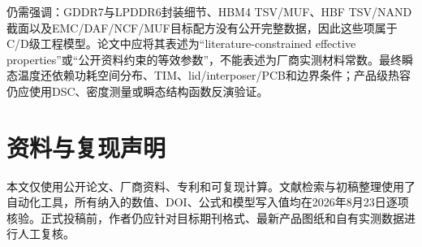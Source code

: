 \documentclass[UTF8,zihao=-4]{ctexart}
\begin{document}
仍需强调：GDDR7与LPDDR6封装细节、HBM4 TSV/MUF、HBF TSV/NAND截面以及EMC/DAF/NCF/MUF目标配方没有公开完整数据，因此这些项属于C/D级工程模型。论文中应将其表述为“literature-constrained effective properties”或“公开资料约束的等效参数”，不能表述为厂商实测材料常数。最终瞬态温度还依赖功耗空间分布、TIM、lid/interposer/PCB和边界条件；产品级热容仍应使用DSC、密度测量或瞬态结构函数反演验证。

\section*{资料与复现声明}
本文仅使用公开论文、厂商资料、专利和可复现计算。文献检索与初稿整理使用了自动化工具，所有纳入的数值、DOI、公式和模型写入值均在2026年8月23日逐项核验。正式投稿前，作者仍应针对目标期刊格式、最新产品图纸和自有实测数据进行人工复核。

\printbibliography[title={参考文献}]
\end{document}
